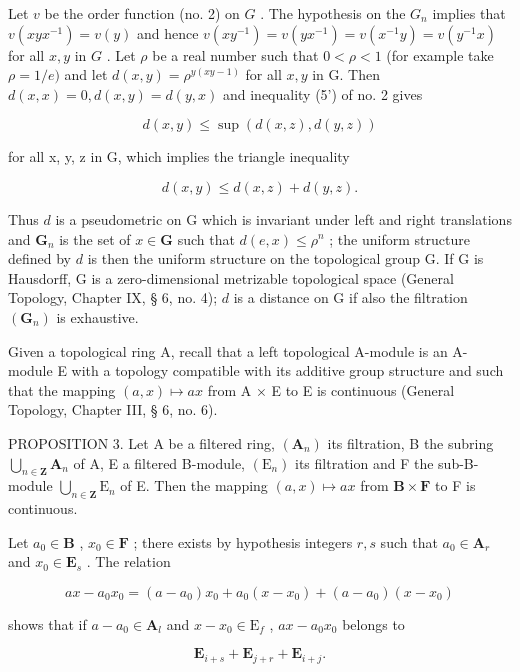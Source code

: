 Let \(v\) be the order function (no. 2) on \(G\) . The hypothesis on the \(G_n\) implies that \(v(xyx^{-1}) = v(y)\) and hence \(v(xy^{-1}) = v(yx^{-1}) = v(x^{-1}y) = v(y^{-1}x)\) for all \(x, y\) in \(G\) . Let \(\rho\) be a real number such that \(0 < \rho < 1\) (for example take \(\rho = 1 / e)\) and let \(d(x,y) = \rho^{y(xy - 1)}\) for all \(x,y\) in G. Then \(d(x,x) = 0, d(x,y) = d(y,x)\) and inequality (5') of no. 2 gives

\[
d (x, y) \leqslant \sup (d (x, z), d (y, z))\tag{15}
\]

for all x, y, z in G, which implies the triangle inequality

\[
d (x, y) \leqslant d (x, z) + d (y, z).
\]

Thus \(d\) is a pseudometric on G which is invariant under left and right translations and \(\mathbf{G}_n\) is the set of \(x \in \mathbf{G}\) such that \(d(e, x) \leqslant \rho^n\) ; the uniform structure defined by \(d\) is then the uniform structure on the topological group G. If G is Hausdorff, G is a zero-dimensional metrizable topological space (General Topology, Chapter IX, § 6, no. 4); \(d\) is a distance on G if also the filtration \((\mathbf{G}_n)\) is exhaustive.

Given a topological ring A, recall that a left topological A-module is an A-module E with a topology compatible with its additive group structure and such that the mapping \((a, x) \mapsto ax\) from A × E to E is continuous (General Topology, Chapter III, § 6, no. 6).

PROPOSITION 3. Let A be a filtered ring, \((\mathbf{A}_n)\) its filtration, B the subring \(\bigcup_{n\in \mathbf{Z}}\mathbf{A}_n\) of A, E a filtered B-module, \((\mathrm{E}_n)\) its filtration and F the sub-B-module \(\bigcup_{n\in \mathbf{Z}}\mathrm{E}_n\) of E. Then the mapping \((a,x)\mapsto ax\) from \(\mathbf{B}\times \mathbf{F}\) to F is continuous.

Let \(a_0 \in \mathbf{B}\) , \(x_0 \in \mathbf{F}\) ; there exists by hypothesis integers \(r, s\) such that \(a_0 \in \mathbf{A}_r\) and \(x_0 \in \mathbf{E}_s\) . The relation

\[
a x - a _ {0} x _ {0} = (a - a _ {0}) x _ {0} + a _ {0} (x - x _ {0}) + (a - a _ {0}) (x - x _ {0})
\]

shows that if \(a - a_0 \in \mathbf{A}_l\) and \(x - x_0 \in \mathrm{E}_f\) , \(ax - a_0x_0\) belongs to

\[
\mathbf {E} _ {i + s} + \mathbf {E} _ {j + r} + \mathbf {E} _ {i + j}.
\]

